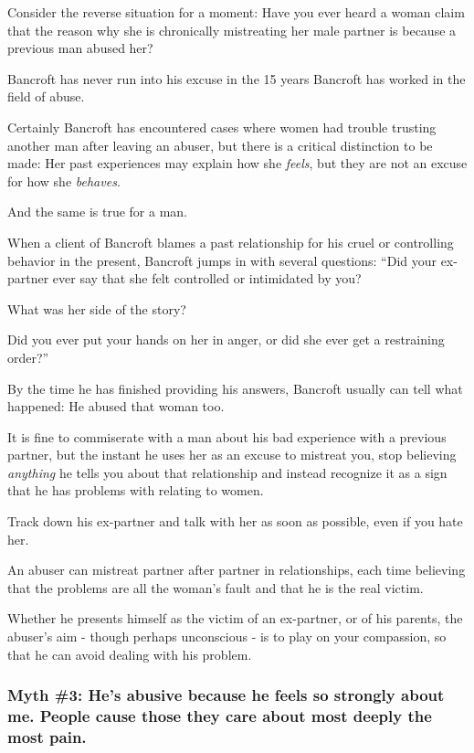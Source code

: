 \documentclass[oneside]{article}
\numberwithin{equation}{section}
\begin{document}
%
Consider the reverse situation for a moment: Have you ever heard a woman claim that the reason why she is chronically mistreating her male partner is because a previous man abused her?

Bancroft has never run into his excuse in the 15 years Bancroft has worked in the field of abuse.

Certainly Bancroft has encountered cases where women had trouble trusting another man after leaving an abuser, but there is a critical distinction to be made: Her past experiences may explain how she \textit{feels}, but they are not an excuse for how she \textit{behaves}.

And the same is true for a man.

%
When a client of Bancroft blames a past relationship for his cruel or controlling behavior in the present, Bancroft jumps in with several questions: ``Did your ex-partner ever say that she felt controlled or intimidated by you?

What was her side of the story?

Did you ever put your hands on her in anger, or did she ever get a restraining order?''

By the time he has finished providing his answers, Bancroft usually can tell what happened: He abused that woman too.

%
It is fine to commiserate with a man about his bad experience with a previous partner, but the instant he uses her as an excuse to mistreat you, stop believing \textit{anything} he tells you about that relationship and instead recognize it as a sign that he has problems with relating to women.

Track down his ex-partner and talk with her as soon as possible, even if you hate her.

An abuser can mistreat partner after partner in relationships, each time believing that the problems are all the woman's fault and that he is the real victim.

%
Whether he presents himself as the victim of an ex-partner, or of his parents, the abuser's aim - though perhaps unconscious - is to play on your compassion, so that he can avoid dealing with his problem.

\subsubsection{Myth \#3: He's abusive because he feels so strongly about me. People cause those they care about most deeply the most pain.}
\end{document}
